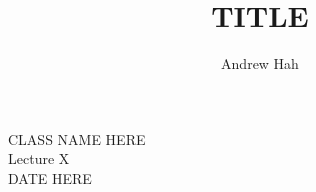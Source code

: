 \documentclass[11pt]{article}
\title{TITLE}
\author{Andrew Hah}
\begin{document}
\pagestyle{plain}
\begin{center}
{\Large CLASS NAME HERE} \\
{\Large Lecture X} \\
\vspace{.2in}
DATE HERE
\end{center}
\end{document}

